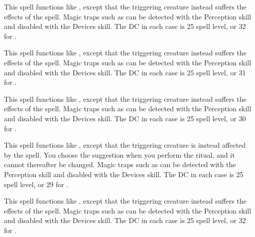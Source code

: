 \spelleffect This spell functions like , except that the triggering creature instead suffers the effects of the  spell.
\spellnotes Magic traps such as  can be detected with the Perception skill and disabled with the Devices skill. The DC in each case is 25 \add spell level, or 32 for .

\spelleffect This spell functions like , except that the triggering creature instead suffers the effects of the  spell.
\spellnotes Magic traps such as  can be detected with the Perception skill and disabled with the Devices skill. The DC in each case is 25 \add spell level, or 31 for .

\spelleffect This spell functions like , except that the triggering creature instead suffers the effects of the  spell.
\spellnotes Magic traps such as  can be detected with the Perception skill and disabled with the Devices skill. The DC in each case is 25 \add spell level, or 30 for .

\spelleffect This spell functions like , except that the triggering creature is instead affected by the  spell. You choose the suggestion when you perform the ritual, and it cannot thereafter be changed.
\spellnotes Magic traps such as  can be detected with the Perception skill and disabled with the Devices skill. The DC in each case is 25 \add spell level, or 29 for .

\spelleffect This spell functions like , except that the triggering creature instead suffers the effects of the  spell.
\spellnotes Magic traps such as  can be detected with the Perception skill and disabled with the Devices skill. The DC in each case is 25 \add spell level, or 32 for .

